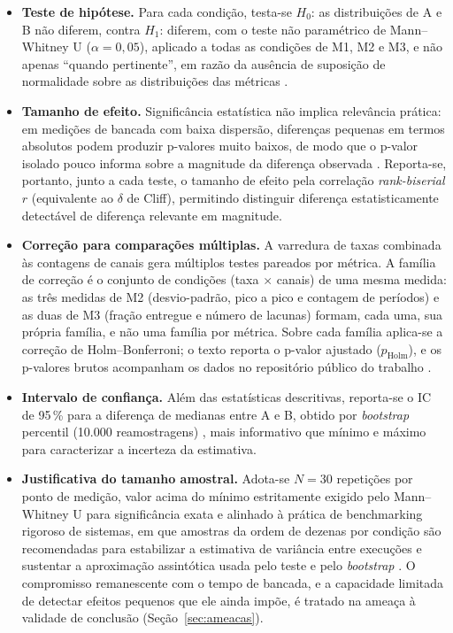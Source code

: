 \begin{itemize}
  \item \textbf{Teste de hipótese.} Para cada condição, testa-se
        $H_0$: as distribuições de A e B não diferem, contra $H_1$: diferem, com o
        teste não paramétrico de Mann--Whitney U ($\alpha = 0{,}05$), aplicado
        a todas as condições de M1, M2 e M3, e não apenas ``quando
        pertinente'', em razão da ausência de
        suposição de normalidade sobre as distribuições das métricas
        \cite{georges2007}.

  \item \textbf{Tamanho de efeito.} Significância estatística não implica
        relevância prática: em medições de bancada com baixa dispersão,
        diferenças pequenas em termos absolutos podem produzir p-valores
        muito baixos, de modo que o p-valor isolado pouco informa sobre a
        magnitude da diferença observada
        \cite{fleming1986,hoefler2015}. Reporta-se, portanto, junto a cada teste,
        o tamanho de efeito pela correlação \emph{rank-biserial} $r$
        (equivalente ao $\delta$ de Cliff), permitindo distinguir diferença estatisticamente detectável de
        diferença relevante em magnitude.

  \item \textbf{Correção para comparações múltiplas.} A varredura de taxas
        combinada às contagens de canais gera múltiplos testes pareados por
        métrica. A família de correção é o conjunto de condições (taxa
        $\times$ canais) de uma mesma medida: as três medidas de M2
        (desvio-padrão, pico a pico e contagem de períodos) e as duas de M3
        (fração entregue e número de lacunas) formam, cada uma, sua própria
        família, e não uma família por métrica. Sobre cada família aplica-se a
        correção de Holm--Bonferroni; o texto reporta o p-valor ajustado
        ($p_{\mathrm{Holm}}$), e os p-valores brutos acompanham os dados no
        repositório público do trabalho \cite{dias2026artefatos}.

  \item \textbf{Intervalo de confiança.} Além das estatísticas descritivas,
        reporta-se o \ac{IC} de 95\,\% para a diferença de medianas
        entre A e B, obtido por \emph{bootstrap} percentil (10.000 reamostragens)
        \cite{kalibera2013}, mais informativo que mínimo e máximo para caracterizar
        a incerteza da estimativa.

  \item \textbf{Justificativa do tamanho amostral.} Adota-se $N = 30$
        repetições por ponto de medição, valor acima do mínimo estritamente exigido
        pelo Mann--Whitney U para significância exata e alinhado à prática de
        benchmarking rigoroso de sistemas, em que amostras da ordem de dezenas por
        condição são recomendadas para estabilizar a estimativa de variância entre
        execuções e sustentar a aproximação assintótica usada pelo teste e pelo
        \emph{bootstrap} \cite{kalibera2013,georges2007,mytkowicz2009}. O
        compromisso remanescente com o tempo de bancada, e a capacidade limitada
        de detectar efeitos pequenos que ele ainda impõe, é tratado na
        ameaça à validade de conclusão (Seção~\ref{sec:ameacas}).


\end{itemize}

